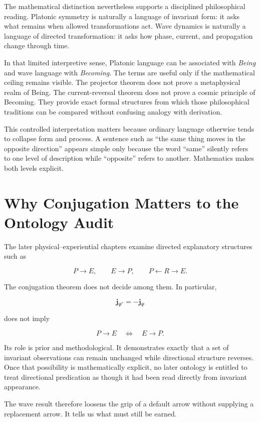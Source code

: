 The mathematical distinction nevertheless supports a disciplined philosophical reading. Platonic symmetry is naturally a language of invariant form: it asks what remains when allowed transformations act. Wave dynamics is naturally a language of directed transformation: it asks how phase, current, and propagation change through time.

In that limited interpretive sense, Platonic language can be associated with \emph{Being} and wave language with \emph{Becoming}. The terms are useful only if the mathematical ceiling remains visible. The projector theorem does not prove a metaphysical realm of Being. The current-reversal theorem does not prove a cosmic principle of Becoming. They provide exact formal structures from which those philosophical traditions can be compared without confusing analogy with derivation.

This controlled interpretation matters because ordinary language otherwise tends to collapse form and process. A sentence such as ``the same thing moves in the opposite direction'' appears simple only because the word ``same'' silently refers to one level of description while ``opposite'' refers to another. Mathematics makes both levels explicit.

\section{Why Conjugation Matters to the Ontology Audit}

The later physical--experiential chapters examine directed explanatory structures such as

\[
P\rightarrow E,
\qquad
E\rightarrow P,
\qquad
P\leftarrow R\rightarrow E.
\]

The conjugation theorem does not decide among them. In particular,

\[
\mathbf j_{\Psi^*}=-\mathbf j_{\Psi}
\]

does not imply

\[
P\rightarrow E
\quad\Longleftrightarrow\quad
E\rightarrow P.
\]

Its role is prior and methodological. It demonstrates exactly that a set of invariant observations can remain unchanged while directional structure reverses. Once that possibility is mathematically explicit, no later ontology is entitled to treat directional predication as though it had been read directly from invariant appearance.

The wave result therefore loosens the grip of a default arrow without supplying a replacement arrow. It tells us what must still be earned.

